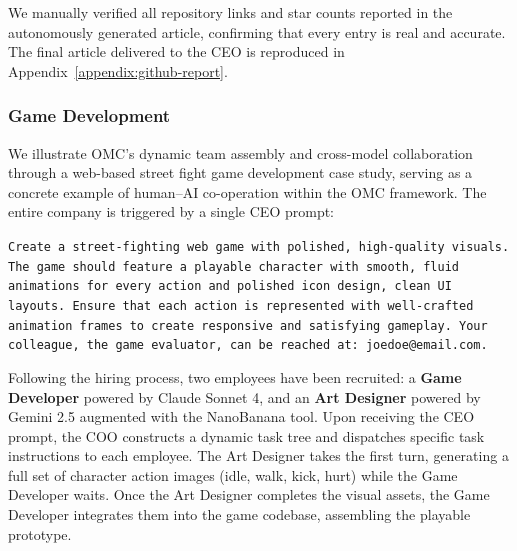 \documentclass[11pt,a4paper]{article}
\begin{document}
We manually verified all repository links and star counts reported in the
autonomously generated article, confirming that every entry is real and accurate. The final article delivered to the CEO is reproduced
in Appendix~\ref{appendix:github-report}.
\subsubsection{Game Development}


We illustrate OMC's dynamic team assembly and cross-model collaboration through a web-based street fight game development case study, serving as a concrete example of human--AI co-operation within the OMC framework. The entire company is triggered by a single CEO prompt:

\begin{mdframed}[
  linewidth=0.8pt,
  linecolor=black!40,
  backgroundcolor=black!2,
  innertopmargin=10pt,
  innerbottommargin=10pt,
  innerleftmargin=14pt,
  innerrightmargin=14pt,
  roundcorner=4pt
]
\sloppy
\noindent\texttt{Create a street-fighting web game with polished, high-quality visuals. The game should feature a playable character with smooth, fluid animations for every action and polished icon design, clean UI layouts. Ensure that each action is represented with well-crafted animation frames to create responsive and satisfying gameplay. Your colleague, the game evaluator, can be reached at: joedoe@email.com.}
\end{mdframed}

Following the hiring process, two employees have been recruited: a \textbf{Game Developer} powered by Claude Sonnet 4, and an \textbf{Art Designer} powered by Gemini 2.5 augmented with the NanoBanana tool. Upon receiving the CEO prompt, the COO constructs a dynamic task tree and dispatches specific task instructions to each employee. The Art Designer takes the first turn, generating a full set of character action images (idle, walk, kick, hurt) while the Game Developer waits. Once the Art Designer completes the visual assets, the Game Developer integrates them into the game codebase, assembling the playable prototype.
\end{document}

